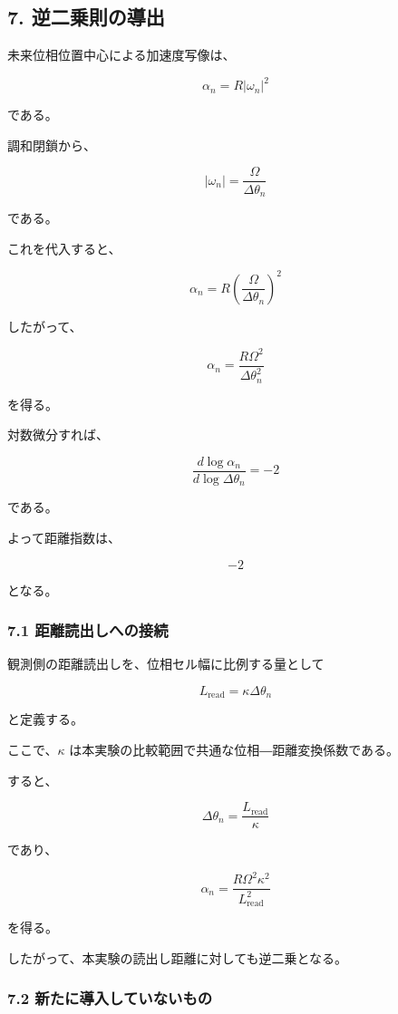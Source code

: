 \documentclass[
  a4paper,
]{ltjsarticle}
\begin{document}
\subsection{7.
逆二乗則の導出}\label{ux9006ux4e8cux4e57ux5247ux306eux5c0eux51fa}

未来位相位置中心による加速度写像は、

\[
\alpha_n=R|\omega_n|^2
\]

である。

調和閉鎖から、

\[
|\omega_n|
=\frac{\Omega}{\Delta\theta_n}
\]

である。

これを代入すると、

\[
\alpha_n
=R\left(\frac{\Omega}{\Delta\theta_n}\right)^2
\]

したがって、

\[
\boxed{
\alpha_n
=\frac{R\Omega^2}{\Delta\theta_n^2}
}
\]

を得る。

対数微分すれば、

\[
\frac{d\log\alpha_n}
{d\log\Delta\theta_n}
=-2
\]

である。

よって距離指数は、

\[
\boxed{-2}
\]

となる。

\subsubsection{7.1
距離読出しへの接続}\label{ux8dddux96e2ux8aadux51faux3057ux3078ux306eux63a5ux7d9a}

観測側の距離読出しを、位相セル幅に比例する量として

\[
L_{\mathrm{read}}
=\kappa\Delta\theta_n
\]

と定義する。

ここで、\(\kappa\) は本実験の比較範囲で共通な位相―距離変換係数である。

すると、

\[
\Delta\theta_n
=\frac{L_{\mathrm{read}}}{\kappa}
\]

であり、

\[
\boxed{
\alpha_n
=\frac{R\Omega^2\kappa^2}
{L_{\mathrm{read}}^2}
}
\]

を得る。

したがって、本実験の読出し距離に対しても逆二乗となる。

\subsubsection{7.2
新たに導入していないもの}\label{ux65b0ux305fux306bux5c0eux5165ux3057ux3066ux3044ux306aux3044ux3082ux306e}
\end{document}
